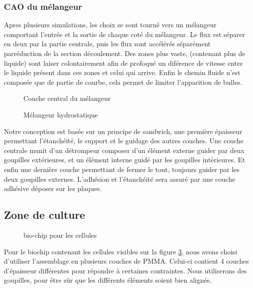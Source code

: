 \documentclass[a4paper, 11pt]{article}
\begin{document}
\subsubsection{CAO du mélangeur}
Apres plusieurs simulations, les choix se sont tourné vers un mélangeur comportant l'entrée et la sortie de chaque
coté du mélangeur. Le flux est séparer en deux par la partie centrale, puis les flux sont accélérés séparément parréduction
de la section découlement. Des zones plus vaste, (contenant plus de liquide) sont laiser colontairement afin de profoqué un diférence de vitesse
entre le liquide présent dans ces zones et celui qui arrive. Enfin le chemin fluide n'est composée que de partie de courbe,
cela permet de limiter l'apparition de bulles.
\begin{multicols}{2}
    \begin{figure}[H]
        \centering
        \caption{Couche central du mélangeur}
        \label{fig:CAO_melangeur_couche2}
    \end{figure}
    \begin{figure}[H]
        \centering
        \caption{Mélangeur hydrostatique}
        \label{fig:CAO_melangeur}
    \end{figure}
\end{multicols}
Notre conception est basée sur un principe de sandwich, une première épaisseur permettant l'étanchéité, le support et le guidage des autres couches.
Une couche centrale munit d'un détrompeur composer d'un élément externe guider par deux goupilles extérieures, et un élément interne guidé par les goupilles intérieures.
Et enfin une dernière couche permettant de fermer le tout, toujours guider par les deux goupilles externes.
L'adhésion et l'étanchéité sera assuré par une couche adhésive déposer sur les plaques.
\subsection{Zone de culture}
\begin{figure}[H]
    \centering
    \caption{bio-chip pour les cellules}
    \label{fig:CAO_cellule}
\end{figure}
Pour le biochip contenant les cellules visibles sur la figure \ref{fig:CAO_cellule}, nous avons choisi d'utiliser l'assemblage en plusieurs couches de PMMA.
Celui-ci contient 4 couches d'épaisseur différentes pour répondre à certaines contraintes.
Nous utiliserons des goupilles, pour être sûr que les différents éléments soient bien alignés.
\end{document}
